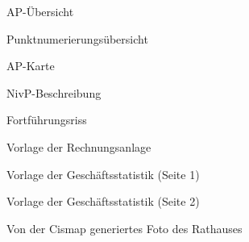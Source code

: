 \begin{figure}[htbp]
	\centering
	\caption*{AP-Übersicht}
	\label{fig:ap-uebersicht}
\end{figure}
\begin{figure}[htbp]
	\centering
	\caption*{Punktnumerierungsübersicht}
	\label{fig:punktnumerierungsuebersicht}
\end{figure}
\begin{figure}[htbp]
	\centering
	\caption*{AP-Karte}
	\label{fig:ap-karte}
\end{figure}
\begin{figure}[htbp]
	\centering
	\caption*{NivP-Beschreibung}
	\label{fig:nivp-beschreibung}
\end{figure}
\begin{figure}[htbp]
	\centering
	\caption*{Fortführungsriss}
	\label{fig:fortfuehrungsriss}
\end{figure}
\begin{figure}[htbp]
	\centering
	\caption*{Vorlage der Rechnungsanlage}
	\label{fig:vorlage_rechnungsanlage}
\end{figure}
\begin{figure}[htbp]
	\centering
	\caption*{Vorlage der Geschäftsstatistik (Seite 1)}
	\label{fig:vorlage_geschaeftsstatistik_1}
\end{figure}
\begin{figure}[htbp]
	\centering
	\caption*{Vorlage der Geschäftsstatistik (Seite 2)}
	\label{fig:vorlage_geschaeftsstatistik_2}
\end{figure}
\begin{figure}[htbp]
	\centering
	\caption*{Von der Cismap generiertes Foto des Rathauses}
	\label{fig:cismap-rathaus}
\end{figure}



